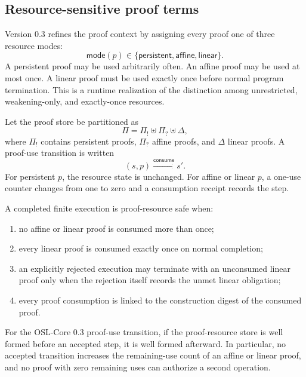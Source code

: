 \subsection{Resource-sensitive proof terms}

Version 0.3 refines the proof context by assigning every proof one of three resource modes:
\[
\mathsf{mode}(p)\in
\{\mathsf{persistent},\mathsf{affine},\mathsf{linear}\}.
\]
A persistent proof may be used arbitrarily often.  An affine proof may be used at most once.  A linear proof must be used exactly once before normal program termination.  This is a runtime realization of the distinction among unrestricted, weakening-only, and exactly-once resources.

Let the proof store be partitioned as
\[
\Pi=\Pi_{!}\uplus\Pi_{?}\uplus\Delta,
\]
where \(\Pi_{!}\) contains persistent proofs, \(\Pi_{?}\) affine proofs, and \(\Delta\) linear proofs.  A proof-use transition is written
\[
(s,p)\xrightarrow{\mathsf{consume}}s'.
\]
For persistent \(p\), the resource state is unchanged.  For affine or linear \(p\), a one-use counter changes from one to zero and a consumption receipt records the step.

\begin{definition}
A completed finite execution is proof-resource safe when:
\begin{enumerate}[label=(\roman*),leftmargin=1.7em]
  \item no affine or linear proof is consumed more than once;
  \item every linear proof is consumed exactly once on normal completion;
  \item an explicitly rejected execution may terminate with an unconsumed linear proof only when the rejection itself records the unmet linear obligation;
  \item every proof consumption is linked to the construction digest of the consumed proof.
\end{enumerate}
\end{definition}

\begin{theorem}
\label{thm:finite-proof-resource}
For the OSL-Core 0.3 proof-use transition, if the proof-resource store is well formed before an accepted step, it is well formed afterward.  In particular, no accepted transition increases the remaining-use count of an affine or linear proof, and no proof with zero remaining uses can authorize a second operation.
\end{theorem}

